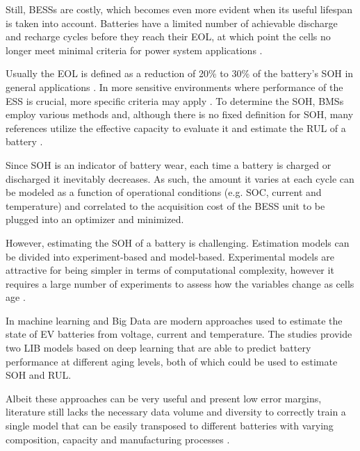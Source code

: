 \documentclass{ieeeaccess}
\begin{document}
    Still, \acp{BESS} are costly, which becomes even more evident when its useful lifespan is taken into account. Batteries have a limited number of achievable discharge and recharge cycles before they reach their \ac{EOL}, at which point the cells no longer meet minimal criteria for power system applications \cite{ZHU2021100537, hart2014modeling}.

    Usually the \ac{EOL} is defined as a reduction of 20\% to 30\% of the battery's \ac{SOH} in general applications \cite{ECKER2014, NARAYAN2018}. In more sensitive environments where performance of the \ac{ESS} is crucial, more specific criteria may apply \cite{WOOD20115147, JACOB2020101565}. To determine the \ac{SOH}, \acp{BMS} employ various methods and, although there is no fixed definition for \ac{SOH}, many references utilize the effective capacity to evaluate it and estimate the \ac{RUL} of a battery \cite{TIAN2020120813, rezvanizaniani2014review, BIOLOGIC2021, bose2002battery}.

    Since \ac{SOH} is an indicator of battery wear, each time a battery is charged or discharged it inevitably decreases. As such, the amount it varies at each cycle can be modeled as a function of operational conditions (e.g. \ac{SOC}, current and temperature) and correlated to the acquisition cost of the \ac{BESS} unit to be plugged into an optimizer and minimized.

    However, estimating the \ac{SOH} of a battery is challenging. Estimation models can be divided into experiment-based and model-based. Experimental models are attractive for being simpler in terms of computational complexity, however it requires a large number of experiments to assess how the variables change as cells age \cite{XIONG2018264}.

    In \cite{li2019lithium,kang2014new} machine learning and Big Data are modern approaches used to estimate the state of \ac{EV} batteries from voltage, current and temperature. The studies provide two \ac{LIB} models based on deep learning that are able to predict battery performance at different aging levels, both of which could be used to estimate \ac{SOH} and \ac{RUL}.

    Albeit these approaches can be very useful and present low error margins, literature still lacks the necessary data volume and diversity to correctly train a single model that can be easily transposed  to different batteries with varying composition, capacity and manufacturing processes \cite{maheshwari2020optimizing}.
\end{document}
